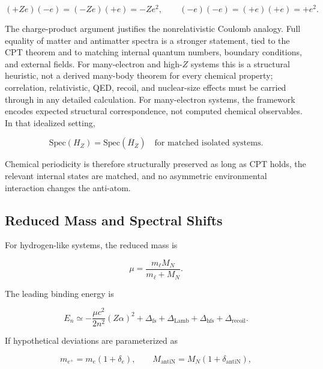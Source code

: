 \documentclass[11pt,a4paper]{article}
\begin{document}
\begin{equation}
(+Ze)(-e)=(-Ze)(+e)=-Ze^2,
\qquad
(-e)(-e)=(+e)(+e)=+e^2.
\end{equation}

The charge-product argument justifies the nonrelativistic Coulomb analogy. Full equality of matter and antimatter spectra is a stronger statement, tied to the CPT theorem and to matching internal quantum numbers, boundary conditions, and external fields. For many-electron and high-$Z$ systems this is a structural heuristic, not a derived many-body theorem for every chemical property; correlation, relativistic, QED, recoil, and nuclear-size effects must be carried through in any detailed calculation. For many-electron systems, the framework encodes expected structural correspondence, not computed chemical observables. In that idealized setting,

\begin{equation}
\mathrm{Spec}\left(H_Z\right)
=
\mathrm{Spec}\left(\overline{H}_Z\right)
\quad
\text{for matched isolated systems.}
\end{equation}

Chemical periodicity is therefore structurally preserved as long as CPT holds, the relevant internal states are matched, and no asymmetric environmental interaction changes the anti-atom.

\subsection{Reduced Mass and Spectral Shifts}

For hydrogen-like systems, the reduced mass is

\begin{equation}
\mu=\frac{m_\ell M_N}{m_\ell+M_N}.
\end{equation}

The leading binding energy is

\begin{equation}
E_n
\simeq
-
\frac{\mu c^2}{2n^2}
(Z\alpha)^2
+\Delta_{\mathrm{fs}}+\Delta_{\mathrm{Lamb}}+\Delta_{\mathrm{hfs}}+\Delta_{\mathrm{recoil}} .
\end{equation}

If hypothetical deviations are parameterized as

\begin{equation}
m_{e^+}=m_e(1+\delta_e),
\qquad
M_{\mathrm{antiN}}=M_N(1+\delta_{\mathrm{antiN}}),
\end{equation}
\end{document}
